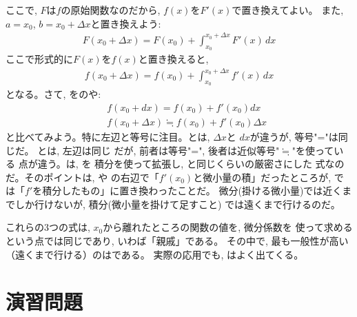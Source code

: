 ここで, $F$は$f$の原始関数なのだから, $f(x)$を$F'(x)$で置き換えてよい。
また, $a=x_0$, $b=x_0+\Delta x$と置き換えよう:
\begin{eqnarray}
F(x_0+\Delta x)=F(x_0)+\int_{x_0}^{x_0+\Delta x}F'(x)\,dx\label{eq:Fb_Fa_int_f1}
\end{eqnarray}
ここで形式的に$F(x)$を$f(x)$と置き換えると, 
\begin{eqnarray}
f(x_0+\Delta x)=f(x_0)+\int_{x_0}^{x_0+\Delta x}f'(x)\,dx\label{eq:fb_fa_int_f'}
\end{eqnarray}
となる。さて, をのや:
\begin{eqnarray}
&&f(x_0+dx) = f(x_0)+f'(x_0)dx \label{eq:define_dif_again3}\\
&&f(x_0+\Delta x) \fallingdotseq f(x_0) + f'(x_0) \Delta x\label{eq:f_Deltax_approx}
\end{eqnarray}
と比べてみよう。特に左辺と等号に注目。とは, $\Delta x$と
$dx$が違うが, 等号"="は同じだ。
とは, 左辺は同じ
だが, 前者は等号"=", 後者は近似等号"$\fallingdotseq$"を使っている
点が違う。は, を
積分を使って拡張し, と同じくらいの厳密さにした
式なのだ。そのポイントは, や
の右辺で「$f'(x_0)$と微小量の積」だったところが, 
では「$f'$を積分したもの」に置き換わったことだ。
微分(掛ける微小量)では近くまでしか行けないが, 積分(微小量を掛けて足すこと)
では遠くまで行けるのだ。

これらの3つの式は, $x_0$から離れたところの関数の値を, 微分係数を
使って求めるという点では同じであり, いわば「親戚」である。
その中で, 最も一般性が高い（遠くまで行ける）のはである。
実際の応用でも, はよく出てくる。
\hv


\section*{演習問題}

